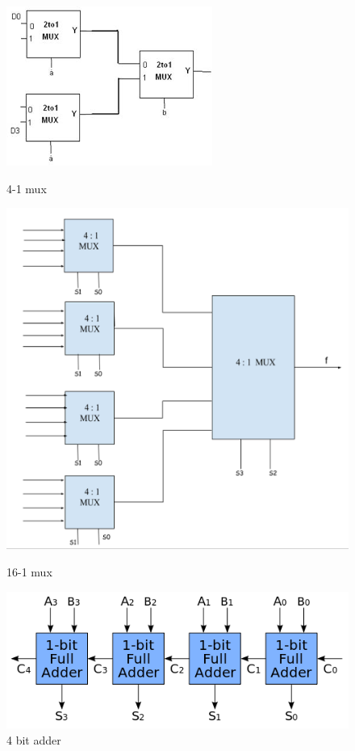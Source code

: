 \documentclass{article}
\begin{document}
\begin{figure}[!htb]
  \includegraphics[width=\linewidth]{mux4-1.png}
  \caption{4-1 mux}\label{fig:mux4-1}
\endminipage\hfill
{}
  \includegraphics[width=\linewidth]{mux16-1.png}
  \caption{16-1 mux}\label{fig:mux16-1}
\endminipage\hfill
{}
  \includegraphics[width=\linewidth]{4-adder.png}
  \caption{4 bit adder}\label{fig:4-adder}
\endminipage\hfill
\end{figure}
\end{document}
